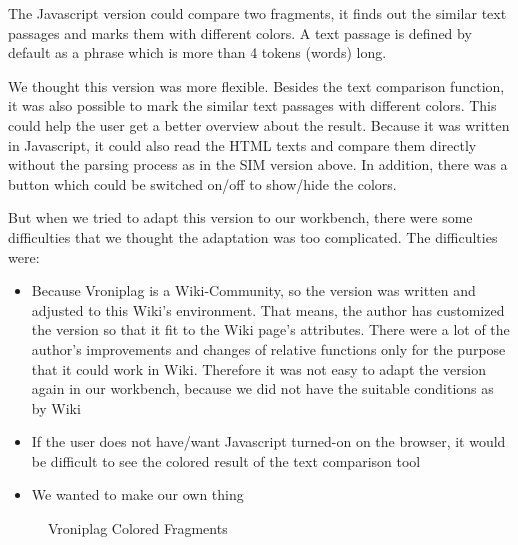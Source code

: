 The Javascript version could compare two fragments, it finds out the similar text passages and marks them with different colors. A text passage is defined by default as a phrase which is more than 4 tokens (words) long.

We thought this version was more flexible. Besides the text comparison function, it was also possible to mark the similar text passages with different colors. This could help the user get a better overview about the result. Because it was written in Javascript, it could also read the HTML texts and compare them directly without the parsing process as in the SIM version above. In addition, there was a button which could be switched on/off to show/hide the colors.

But when we tried to adapt this version to our workbench, there were some difficulties that we thought the adaptation was too complicated. The difficulties were:
\begin{itemize}
\item Because Vroniplag is a Wiki-Community, so the version was written and adjusted to this Wiki’s environment. That means, the author has customized the version so that it fit to the Wiki page’s attributes. There were a lot of the author’s improvements and changes of relative functions only for the purpose that it could work in Wiki. Therefore it was not easy to adapt the version again in our workbench, because we did not have the suitable conditions as by Wiki
\item If the user does not have/want Javascript turned-on on the browser, it would be difficult to see the colored result of the text comparison tool
\item We wanted to make our own thing
\end{itemize}

\begin{figure}[!h]
  \centering
  \caption{Vroniplag Colored Fragments}
  \label{fig:Vroniplag_Colored_Fragments}
\end{figure}

